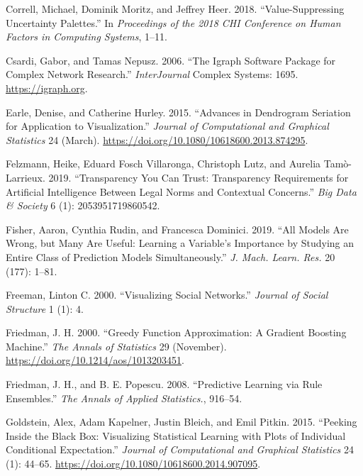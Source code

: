 \begin{CSLReferences}{1}{0}
\leavevmode{}%
Correll, Michael, Dominik Moritz, and Jeffrey Heer. 2018. {``Value-{S}uppressing {U}ncertainty {P}alettes.''} In \emph{Proceedings of the 2018 CHI Conference on Human Factors in Computing Systems}, 1--11.

\leavevmode{}%
Csardi, Gabor, and Tamas Nepusz. 2006. {``The Igraph Software Package for Complex Network Research.''} \emph{InterJournal} Complex Systems: 1695. \url{https://igraph.org}.

\leavevmode{}%
Earle, Denise, and Catherine Hurley. 2015. {``Advances in Dendrogram Seriation for Application to Visualization.''} \emph{Journal of Computational and Graphical Statistics} 24 (March). \url{https://doi.org/10.1080/10618600.2013.874295}.

\leavevmode{}%
Felzmann, Heike, Eduard Fosch Villaronga, Christoph Lutz, and Aurelia Tamò-Larrieux. 2019. {``Transparency You Can Trust: Transparency Requirements for Artificial Intelligence Between Legal Norms and Contextual Concerns.''} \emph{Big Data \& Society} 6 (1): 2053951719860542.

\leavevmode{}%
Fisher, Aaron, Cynthia Rudin, and Francesca Dominici. 2019. {``All Models Are Wrong, but Many Are Useful: Learning a Variable's Importance by Studying an Entire Class of Prediction Models Simultaneously.''} \emph{J. Mach. Learn. Res.} 20 (177): 1--81.

\leavevmode{}%
Freeman, Linton C. 2000. {``Visualizing Social Networks.''} \emph{Journal of Social Structure} 1 (1): 4.

\leavevmode{}%
Friedman, J. H. 2000. {``Greedy Function Approximation: A Gradient Boosting Machine.''} \emph{The Annals of Statistics} 29 (November). \url{https://doi.org/10.1214/aos/1013203451}.

\leavevmode{}%
Friedman, J. H., and B. E. Popescu. 2008. {``Predictive Learning via Rule Ensembles.''} \emph{The Annals of Applied Statistics.}, 916--54.

\leavevmode{}%
Goldstein, Alex, Adam Kapelner, Justin Bleich, and Emil Pitkin. 2015. {``Peeking Inside the Black Box: Visualizing Statistical Learning with Plots of Individual Conditional Expectation.''} \emph{Journal of Computational and Graphical Statistics} 24 (1): 44--65. \url{https://doi.org/10.1080/10618600.2014.907095}.


\end{CSLReferences}
